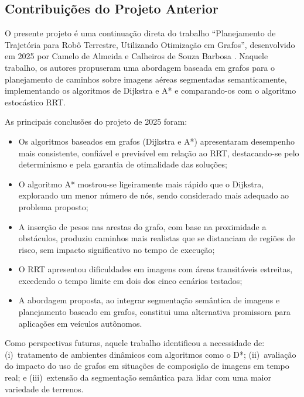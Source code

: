 \documentclass[
    12pt,
    openright,
    oneside,
    a4paper,
    english,
    brazil
]{abntex2}
\begin{document}
\subsection*{Contribuições do Projeto Anterior}

O presente projeto é uma continuação direta do trabalho ``Planejamento de Trajetória para Robô Terrestre, Utilizando Otimização em Grafos'', desenvolvido em 2025 por Camelo de Almeida e Calheiros de Souza Barbosa \cite{camelo2025}. Naquele trabalho, os autores propuseram uma abordagem baseada em grafos para o planejamento de caminhos sobre imagens aéreas segmentadas semanticamente, implementando os algoritmos de Dijkstra e A* e comparando-os com o algoritmo estocástico RRT.

As principais conclusões do projeto de 2025 foram:
\begin{itemize}
    \item Os algoritmos baseados em grafos (Dijkstra e A*) apresentaram desempenho mais consistente, confiável e previsível em relação ao RRT, destacando-se pelo determinismo e pela garantia de otimalidade das soluções;
    \item O algoritmo A* mostrou-se ligeiramente mais rápido que o Dijkstra, explorando um menor número de nós, sendo considerado mais adequado ao problema proposto;
    \item A inserção de pesos nas arestas do grafo, com base na proximidade a obstáculos, produziu caminhos mais realistas que se distanciam de regiões de risco, sem impacto significativo no tempo de execução;
    \item O RRT apresentou dificuldades em imagens com áreas transitáveis estreitas, excedendo o tempo limite em dois dos cinco cenários testados;
    \item A abordagem proposta, ao integrar segmentação semântica de imagens e planejamento baseado em grafos, constitui uma alternativa promissora para aplicações em veículos autônomos.
\end{itemize}

Como perspectivas futuras, aquele trabalho identificou a necessidade de: (i)~tratamento de ambientes dinâmicos com algoritmos como o D*; (ii)~avaliação do impacto do uso de grafos em situações de composição de imagens em tempo real; e (iii)~extensão da segmentação semântica para lidar com uma maior variedade de terrenos.
\end{document}

